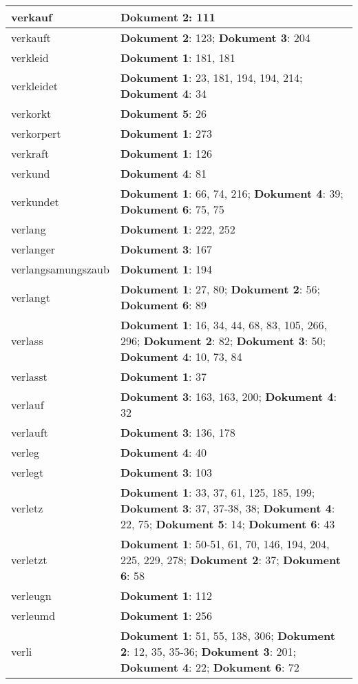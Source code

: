 \documentclass[a5paper]{article}
\begin{document}
\begin{longtable}[l]{|l|p{3in}|}
\hline
verkauf & \textbf{Dokument 2}: 111 \\
\hline
verkauft & \textbf{Dokument 2}: 123; \textbf{Dokument 3}: 204 \\
\hline
verkleid & \textbf{Dokument 1}: 181, 181 \\
\hline
verkleidet & \textbf{Dokument 1}: 23, 181, 194, 194, 214; \textbf{Dokument 4}: 34 \\
\hline
verkorkt & \textbf{Dokument 5}: 26 \\
\hline
verkorpert & \textbf{Dokument 1}: 273 \\
\hline
verkraft & \textbf{Dokument 1}: 126 \\
\hline
verkund & \textbf{Dokument 4}: 81 \\
\hline
verkundet & \textbf{Dokument 1}: 66, 74, 216; \textbf{Dokument 4}: 39; \textbf{Dokument 6}: 75, 75 \\
\hline
verlang & \textbf{Dokument 1}: 222, 252 \\
\hline
verlanger & \textbf{Dokument 3}: 167 \\
\hline
verlangsamungszaub & \textbf{Dokument 1}: 194 \\
\hline
verlangt & \textbf{Dokument 1}: 27, 80; \textbf{Dokument 2}: 56; \textbf{Dokument 6}: 89 \\
\hline
verlass & \textbf{Dokument 1}: 16, 34, 44, 68, 83, 105, 266, 296; \textbf{Dokument 2}: 82; \textbf{Dokument 3}: 50; \textbf{Dokument 4}: 10, 73, 84 \\
\hline
verlasst & \textbf{Dokument 1}: 37 \\
\hline
verlauf & \textbf{Dokument 3}: 163, 163, 200; \textbf{Dokument 4}: 32 \\
\hline
verlauft & \textbf{Dokument 3}: 136, 178 \\
\hline
verleg & \textbf{Dokument 4}: 40 \\
\hline
verlegt & \textbf{Dokument 3}: 103 \\
\hline
verletz & \textbf{Dokument 1}: 33, 37, 61, 125, 185, 199; \textbf{Dokument 3}: 37, 37-38, 38; \textbf{Dokument 4}: 22, 75; \textbf{Dokument 5}: 14; \textbf{Dokument 6}: 43 \\
\hline
verletzt & \textbf{Dokument 1}: 50-51, 61, 70, 146, 194, 204, 225, 229, 278; \textbf{Dokument 2}: 37; \textbf{Dokument 6}: 58 \\
\hline
verleugn & \textbf{Dokument 1}: 112 \\
\hline
verleumd & \textbf{Dokument 1}: 256 \\
\hline
verli & \textbf{Dokument 1}: 51, 55, 138, 306; \textbf{Dokument 2}: 12, 35, 35-36; \textbf{Dokument 3}: 201; \textbf{Dokument 4}: 22; \textbf{Dokument 6}: 72 \\

\end{longtable}
\end{document}
